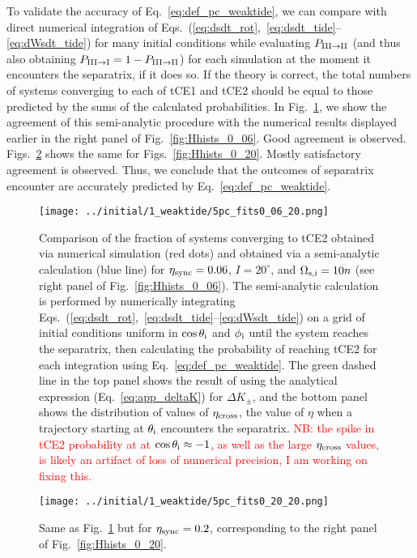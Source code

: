 \documentclass[
        fleqn,
        usenatbib,
        referee,
    ]{mnras}
\newlength{\colummwidth}
\begin{document}
To validate the accuracy of Eq.~\eqref{eq:def_pc_weaktide}, we can compare with
direct numerical integration of
Eqs.~(\ref{eq:dsdt_rot},~\ref{eq:dsdt_tide}--\ref{eq:dWsdt_tide}) for many
initial conditions while evaluating $P_{\rm III \to II}$ (and thus also
obtaining $P_{\rm III \to I} = 1 - P_{\rm III \to II}$) for each simulation at
the moment it encounters the separatrix, if it does so. If the theory is
correct, the total numbers of systems converging to each of tCE1 and tCE2 should
be equal to those predicted by the sums of the calculated probabilities. In
Fig.~\ref{fig:pc_fits_0_06}, we show the agreement of this semi-analytic
procedure with the numerical results displayed earlier in the right panel of
Fig.~\ref{fig:Hhists_0_06}. Good agreement is observed.
Figs.~\ref{fig:pc_fits_0_20} shows the same for Figs.~\ref{fig:Hhists_0_20}.
Mostly satisfactory agreement is observed. Thus, we conclude that the outcomes
of separatrix encounter are accurately predicted by
Eq.~\eqref{eq:def_pc_weaktide}.
\begin{figure}
    \centering
    \texttt{[image: ../initial/1\_weaktide/5pc\_fits0\_06\_20.png]}
    \caption{Comparison of the fraction of systems converging to tCE2 obtained
    via numerical simulation (red dots) and obtained via a semi-analytic
    calculation (blue line) for $\eta_{\rm sync} = 0.06$, $I = 20^\circ$, and
    $\Omega_{\rm s, i} = 10n$ (see right panel of Fig.~\ref{fig:Hhists_0_06}).
    The semi-analytic calculation is performed by numerically integrating
    Eqs.~(\ref{eq:dsdt_rot},~\ref{eq:dsdt_tide}--\ref{eq:dWsdt_tide}) on a grid
    of initial conditions uniform in $\cos \theta_{\rm i}$ and $\phi_{\rm i}$
    until the system reaches the separatrix, then calculating the probability of
    reaching tCE2 for each integration using Eq.~\eqref{eq:def_pc_weaktide}. The
    green dashed line in the top panel shows the result of using the analytical
    expression (Eq.~\ref{eq:app_deltaK}) for $\Delta K_{\pm}$, and the bottom
    panel shows the distribution of values of $\eta_{\rm cross}$, the value of
    $\eta$ when a trajectory starting at $\theta_{\rm i}$ encounters the
    separatrix.
    \textcolor{red}{NB\@: the spike in tCE2 probability at at $\cos
    \theta_{\rm i} \approx -1$, as well as the large $\eta_{\rm cross}$ values,
    is likely an artifact of loss of numerical precision, I am working on fixing
    this.}
    }\label{fig:pc_fits_0_06}
\end{figure}
\begin{figure}
    \centering
    \texttt{[image: ../initial/1\_weaktide/5pc\_fits0\_20\_20.png]}
    \caption{Same as Fig.~\ref{fig:pc_fits_0_06} but for $\eta_{\rm sync} =
    0.2$, corresponding to the right panel of
    Fig.~\ref{fig:Hhists_0_20}.}\label{fig:pc_fits_0_20}
\end{figure}
\end{document}
